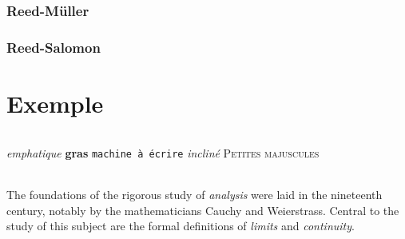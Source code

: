 \documentclass[a4paper,10pt]{report}
\begin{document}
        \section{Reed-Müller}

        \section{Reed-Salomon}


    \part{Exemple}

        \paragraph{}
            \emph{emphatique}
            \textbf{gras}
            \texttt{machine à écrire}
            \textsl{incliné}
            \textsc{Petites majuscules}

        \paragraph{}
            The foundations of the rigorous study of \emph{analysis}
            were laid in the nineteenth century, notably by the
            mathematicians Cauchy and Weierstrass. Central to the
            study of this subject are the formal definitions of
            \emph{limits} and \emph{continuity}.
\end{document}
